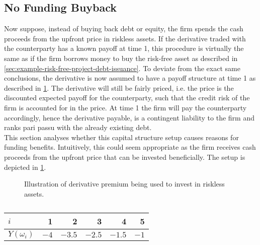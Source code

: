\documentclass[main.tex]{subfiles}
\begin{document}
        \subsection{No Funding Buyback}
            Now suppose, instead of buying back debt or equity, 
            the firm spends the cash proceeds from the upfront price in riskless assets. 
            If the derivative traded with the counterparty has a known payoff at time 1, this procedure is virtually the same as if the firm borrows money to buy the risk-free asset 
            as described in \cref{sec:example-risk-free-project-debt-issuance}. 
            To deviate from the exact same conclusions, the derivative is now assumed to have a payoff structure at time 1 
            as described in \cref{tbl:risky-option-payoff}. 
            The derivative will still be fairly priced, i.e. the price is the discounted expected payoff for the counterparty, 
            such that the credit risk of the firm is accounted for in the price. 
            At time 1 the firm will pay the counterparty accordingly, hence the derivative payable, 
            is a contingent liability to the firm and ranks pari passu with the already existing debt.
            \\
            This section analyses whether this capital structure setup causes reasons for funding benefits.
            Intuitively, this could seem appropriate as the firm receives cash proceeds from the upfront price that can be invested beneficially.
            The setup is depicted in \cref{fig:no-funding-buyback-setup}.
            \begin{figure}[t]
                \centering
                \caption{Illustration of derivative premium being used to invest in riskless assets.}
                \label{fig:no-funding-buyback-setup}
            \end{figure}
            \begin{table}[H]
                \centering
                \begin{tabular}{l|rrrrr}
                    $i$ & 1 & 2 & 3 & 4 & 5 \\
                    \hline
                    $Y(\omega_{i})$ & $\num{-4}$ & $\num{-3.5}$ & $\num{-2.5}$ & $\num{-1.5}$ & $\num{-1}$ \\
                \end{tabular}
                \caption{}
                \label{tbl:risky-option-payoff}
            \end{table}
\end{document}
